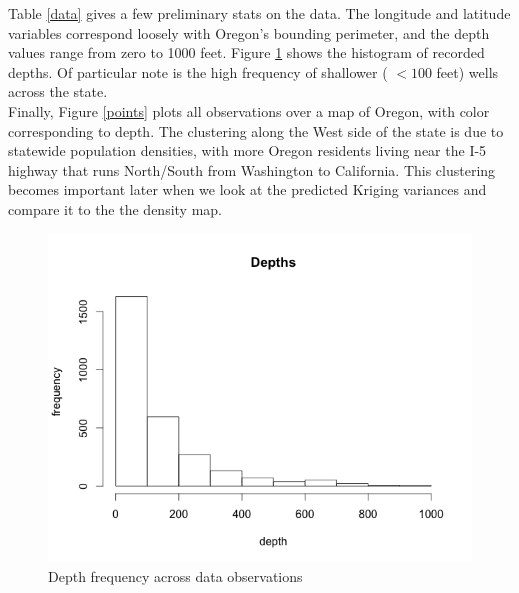 \documentclass[12pt,twoside]{reedthesis}
\begin{document}
Table \ref{data} gives a few preliminary stats on the data. The longitude and latitude variables correspond loosely with Oregon's bounding perimeter, and the depth values range from zero to 1000 feet. Figure \ref{depths} shows the histogram of recorded depths. Of particular note is the high frequency of shallower ( $<100$ feet) wells across the state. \\

Finally, Figure \ref{points} plots all observations over a map of Oregon, with color corresponding to depth. The clustering along the West side of the state is due to statewide population densities, with more Oregon residents living near the I-5 highway that runs North/South from Washington to California. This clustering becomes important later when we look at the predicted Kriging variances and compare it to the the density map.

\begin{figure}[h]
	   
	       \centering
	  
	    \includegraphics[scale=0.6]{depth_hist}
	
	     \caption{Depth frequency across data observations}
	 \label{depths}
	\end{figure}
\end{document}
